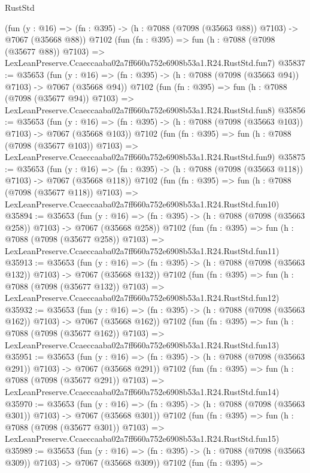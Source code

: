 \begin{lexlean}{RustStd}
\begin{coremodule}
    (fun (y : @16) => (fn : @395) -> (h : @7088 (@7098 (@35663 @88)) @7103) -> @7067 (@35668 @88))
    @7102
    (fun (fn : @395) =>
    fun (h : @7088 (@7098 (@35677 @88)) @7103) =>
    LexLeanPreserve.Ccaeccaaba02a7ff660a752e6908b53a1.R24.RustStd.fun7)
@35837 := @35653
    (fun (y : @16) => (fn : @395) -> (h : @7088 (@7098 (@35663 @94)) @7103) -> @7067 (@35668 @94))
    @7102
    (fun (fn : @395) =>
    fun (h : @7088 (@7098 (@35677 @94)) @7103) =>
    LexLeanPreserve.Ccaeccaaba02a7ff660a752e6908b53a1.R24.RustStd.fun8)
@35856 := @35653
    (fun (y : @16) => (fn : @395) -> (h : @7088 (@7098 (@35663 @103)) @7103) -> @7067 (@35668 @103))
    @7102
    (fun (fn : @395) =>
    fun (h : @7088 (@7098 (@35677 @103)) @7103) =>
    LexLeanPreserve.Ccaeccaaba02a7ff660a752e6908b53a1.R24.RustStd.fun9)
@35875 := @35653
    (fun (y : @16) => (fn : @395) -> (h : @7088 (@7098 (@35663 @118)) @7103) -> @7067 (@35668 @118))
    @7102
    (fun (fn : @395) =>
    fun (h : @7088 (@7098 (@35677 @118)) @7103) =>
    LexLeanPreserve.Ccaeccaaba02a7ff660a752e6908b53a1.R24.RustStd.fun10)
@35894 := @35653
    (fun (y : @16) => (fn : @395) -> (h : @7088 (@7098 (@35663 @258)) @7103) -> @7067 (@35668 @258))
    @7102
    (fun (fn : @395) =>
    fun (h : @7088 (@7098 (@35677 @258)) @7103) =>
    LexLeanPreserve.Ccaeccaaba02a7ff660a752e6908b53a1.R24.RustStd.fun11)
@35913 := @35653
    (fun (y : @16) => (fn : @395) -> (h : @7088 (@7098 (@35663 @132)) @7103) -> @7067 (@35668 @132))
    @7102
    (fun (fn : @395) =>
    fun (h : @7088 (@7098 (@35677 @132)) @7103) =>
    LexLeanPreserve.Ccaeccaaba02a7ff660a752e6908b53a1.R24.RustStd.fun12)
@35932 := @35653
    (fun (y : @16) => (fn : @395) -> (h : @7088 (@7098 (@35663 @162)) @7103) -> @7067 (@35668 @162))
    @7102
    (fun (fn : @395) =>
    fun (h : @7088 (@7098 (@35677 @162)) @7103) =>
    LexLeanPreserve.Ccaeccaaba02a7ff660a752e6908b53a1.R24.RustStd.fun13)
@35951 := @35653
    (fun (y : @16) => (fn : @395) -> (h : @7088 (@7098 (@35663 @291)) @7103) -> @7067 (@35668 @291))
    @7102
    (fun (fn : @395) =>
    fun (h : @7088 (@7098 (@35677 @291)) @7103) =>
    LexLeanPreserve.Ccaeccaaba02a7ff660a752e6908b53a1.R24.RustStd.fun14)
@35970 := @35653
    (fun (y : @16) => (fn : @395) -> (h : @7088 (@7098 (@35663 @301)) @7103) -> @7067 (@35668 @301))
    @7102
    (fun (fn : @395) =>
    fun (h : @7088 (@7098 (@35677 @301)) @7103) =>
    LexLeanPreserve.Ccaeccaaba02a7ff660a752e6908b53a1.R24.RustStd.fun15)
@35989 := @35653
    (fun (y : @16) => (fn : @395) -> (h : @7088 (@7098 (@35663 @309)) @7103) -> @7067 (@35668 @309))
    @7102
    (fun (fn : @395) =>

\end{coremodule}
\end{lexlean}
